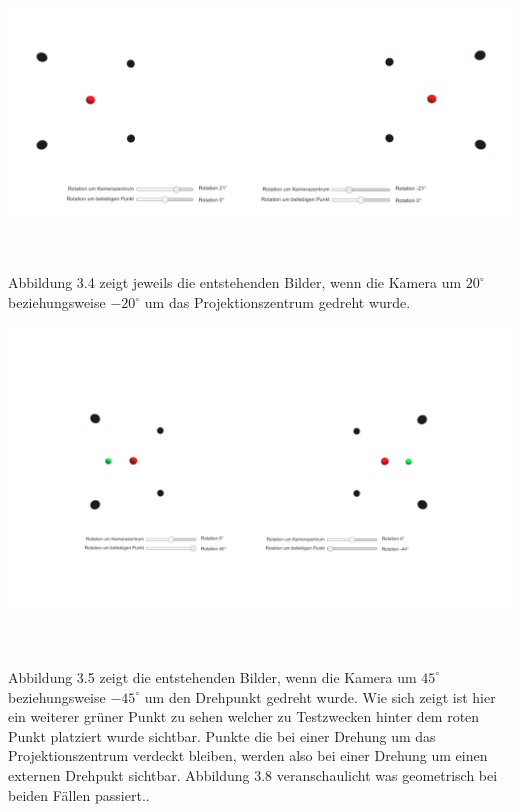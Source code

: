 \begin{minipage}{\linewidth}
	\centering
	\includegraphics[width=1.\linewidth]{images/DrehungPZ.png}
\end{minipage}\\ \\

Abbildung 3.4 zeigt jeweils die entstehenden Bilder, wenn die Kamera um \ensuremath{20^\circ} beziehungsweise \ensuremath{-20^\circ} um das Projektionszentrum gedreht wurde.

\begin{minipage}{\linewidth}
	\centering
	\includegraphics[width=1.\linewidth]{images/DrehungDZ.png}
\end{minipage}\\ \\

Abbildung 3.5 zeigt die entstehenden Bilder, wenn die Kamera um \ensuremath{45^\circ} beziehungsweise \ensuremath{-45^\circ} um den Drehpunkt gedreht wurde. Wie sich zeigt ist hier ein weiterer grüner Punkt zu sehen welcher zu Testzwecken hinter dem roten Punkt platziert wurde sichtbar. Punkte die bei einer Drehung um das Projektionszentrum verdeckt bleiben, werden also bei einer Drehung um einen externen Drehpukt sichtbar. Abbildung 3.8 veranschaulicht was geometrisch bei beiden Fällen passiert..

